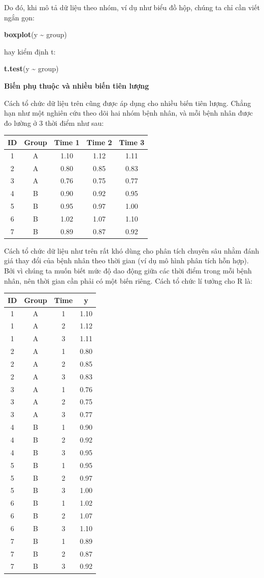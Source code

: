 \documentclass[
]{book}
\newenvironment{Shaded}{\begin{snugshade}}{\end{snugshade}}
\newcommand{\KeywordTok}[1]{\textcolor[rgb]{0.13,0.29,0.53}{\textbf{#1}}}
\newcommand{\NormalTok}[1]{#1}
\newcommand{\OperatorTok}[1]{\textcolor[rgb]{0.81,0.36,0.00}{\textbf{#1}}}
\newcommand{\StringTok}[1]{\textcolor[rgb]{0.31,0.60,0.02}{#1}}
\begin{document}
Do đó, khi mô tả dữ liệu theo nhóm, ví dụ như biểu đồ hộp, chúng ta chỉ cần viết ngắn gọn:

\begin{Shaded}
\begin{Highlighting}[]
\KeywordTok{boxplot}\NormalTok{(y }\OperatorTok{\textasciitilde{}}\StringTok{ }\NormalTok{group)}
\end{Highlighting}
\end{Shaded}

hay kiểm định t:

\begin{Shaded}
\begin{Highlighting}[]
\KeywordTok{t.test}\NormalTok{(y }\OperatorTok{\textasciitilde{}}\StringTok{ }\NormalTok{group) }
\end{Highlighting}
\end{Shaded}

\textbf{Biến phụ thuộc và nhiều biến tiên lượng}

Cách tổ chức dữ liệu trên cũng được áp dụng cho nhiều biến tiên lượng. Chẳng hạn như một nghiên cứu theo dõi hai nhóm bệnh nhân, và mỗi bệnh nhân được đo lường ở 3 thời điểm như sau:

\begin{longtable}[]{@{}ccccc@{}}
\toprule
\textbf{ID} & \textbf{Group} & \textbf{Time 1} & \textbf{Time 2} & \textbf{Time 3}\tabularnewline
\midrule
\endhead
1 & A & 1.10 & 1.12 & 1.11\tabularnewline
2 & A & 0.80 & 0.85 & 0.83\tabularnewline
3 & A & 0.76 & 0.75 & 0.77\tabularnewline
4 & B & 0.90 & 0.92 & 0.95\tabularnewline
5 & B & 0.95 & 0.97 & 1.00\tabularnewline
6 & B & 1.02 & 1.07 & 1.10\tabularnewline
7 & B & 0.89 & 0.87 & 0.92\tabularnewline
\bottomrule
\end{longtable}

Cách tổ chức dữ liệu như trên rất khó dùng cho phân tích chuyên sâu nhằm đánh giá thay đổi của bệnh nhân theo thời gian (ví dụ mô hình phân tích hỗn hợp). Bởi vì chúng ta muốn biết mức độ dao động giữa các thời điểm trong mỗi bệnh nhân, nên thời gian cần phải có một biến riêng. Cách tổ chức lí tưởng cho R là:

\begin{longtable}[]{@{}cccc@{}}
\toprule
\textbf{ID} & \textbf{Group} & \textbf{Time} & \textbf{y}\tabularnewline
\midrule
\endhead
1 & A & 1 & 1.10\tabularnewline
1 & A & 2 & 1.12\tabularnewline
1 & A & 3 & 1.11\tabularnewline
2 & A & 1 & 0.80\tabularnewline
2 & A & 2 & 0.85\tabularnewline
2 & A & 3 & 0.83\tabularnewline
3 & A & 1 & 0.76\tabularnewline
3 & A & 2 & 0.75\tabularnewline
3 & A & 3 & 0.77\tabularnewline
4 & B & 1 & 0.90\tabularnewline
4 & B & 2 & 0.92\tabularnewline
4 & B & 3 & 0.95\tabularnewline
5 & B & 1 & 0.95\tabularnewline
5 & B & 2 & 0.97\tabularnewline
5 & B & 3 & 1.00\tabularnewline
6 & B & 1 & 1.02\tabularnewline
6 & B & 2 & 1.07\tabularnewline
6 & B & 3 & 1.10\tabularnewline
7 & B & 1 & 0.89\tabularnewline
7 & B & 2 & 0.87\tabularnewline
7 & B & 3 & 0.92\tabularnewline
\bottomrule
\end{longtable}
\end{document}
